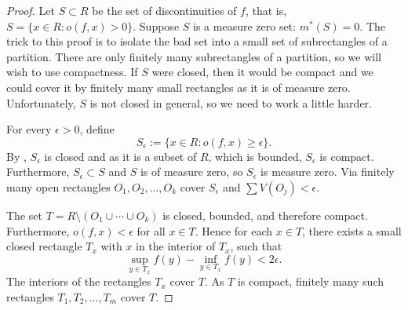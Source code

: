 \begin{proof}
Let $S \subset R$ be the set of discontinuities of $f$, that is,
$S = \bigl\{ x \in R : o(f,x) > 0 \bigr\}$.
Suppose $S$ is a measure zero set: $m^*(S) = 0$.
The trick to this proof is to isolate the
bad set into a small set of subrectangles of a partition.  There are only
finitely many subrectangles of a partition, so we will wish to use
compactness.  If $S$ were closed, then it would be compact and we could cover
it by finitely many small rectangles as it is of measure zero.  Unfortunately, $S$
is not closed in general, so we need to work a little harder.

For every $\epsilon > 0$, define
\begin{equation*}
S_\epsilon := \bigl\{ x \in R : o(f,x) \geq \epsilon \bigr\} .
\end{equation*}
By , $S_\epsilon$ is closed and as it is a subset of
$R$,
which is bounded, $S_\epsilon$ is compact.  Furthermore,
$S_\epsilon \subset S$ and $S$ is of measure zero, so $S_\epsilon$ is
measure zero.
Via  finitely many open rectangles
$O_1,O_2,\ldots,O_k$ cover $S_\epsilon$ and
$\sum V(O_j) < \epsilon$.  

The set $T = R \setminus ( O_1 \cup \cdots \cup O_k )$ is closed, bounded,
and therefore compact.  Furthermore, $o(f,x) < \epsilon$ for all $x \in T$.
Hence for each $x \in T$, there exists a small closed rectangle
$T_x$ with $x$ in the interior of $T_x$, such that
\begin{equation*}
\sup_{y\in T_x} f(y) - \inf_{y\in T_x} f(y) < 2\epsilon.
\end{equation*}
The interiors of the rectangles $T_x$ cover $T$.  As $T$ is compact,
finitely many such rectangles $T_1, T_2, \ldots, T_m$
cover $T$.


\end{proof}
